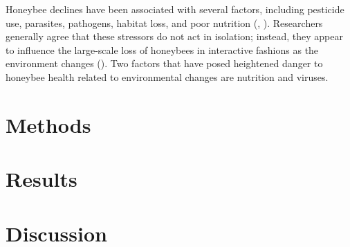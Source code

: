 \documentclass[11pt,a4paper,oldfontcommands,openany]{memoir}
\numberwithin{equation}{section} %
\newcommand{\code}[1]{{\texttt{#1}}}
\newcommand{\pkg}[1]{{\texttt{#1}}}
\begin{document}
Honeybee declines have been associated with several factors, including pesticide use, parasites, pathogens, habitat loss, and poor nutrition (\citealt{factors}, \citealt{factors2}). Researchers generally agree that these stressors do not act in isolation; instead, they appear to influence the large-scale loss of honeybees in interactive fashions as the environment changes (\citealt{interacting}). Two factors that have posed heightened danger to honeybee health related to environmental changes are nutrition and viruses.






\section{Methods}


\section{Results}


\section{Discussion}









\end{document}
